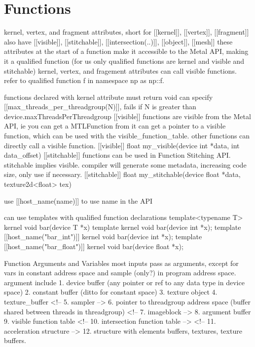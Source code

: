 

\section{Functions}

kernel, vertex, and fragment attributes, short for [[kernel]], [[vertex]], [[fragment]]
also have [[visible]], [[stitchable]], [[intersection(..)]], [[object]], [[mesh]]
these attributes at the start of a function make it accessible to the Metal API, making it a qualified function (for us only qualified functions are kernel and visible and stitchable)
kernel, vertex, and fragement attributes can call visible functions.
refer to qualified function f in namespace np as np::f.

functions declared with kernel attribute must return void
can specify [[max_threads_per_threadgroup(N)]], fails if N is greater than device.maxThreadsPerThreadgroup
[[visible]] functions are visible from the Metal API, ie you can get a MTLFunction from it can get a pointer to a visible function, which can be used with the visible_function_table. other functions can directly call a visible function.
[[visible]] float my_visible(device int *data, int data_offset) {}
[[stitchable]] functions can be used in Function Stitching API. stitchable implies visible. compiler will generate some metadata, increasing code size, only use if necessary.
[[stitchable]] float my_stitchable(device float *data, texture2d<float> tex) {}

use [[host_name(name)]] to use name in the API

can use templates with qualified function declarations
template<typename T>
kernel void bar(device T *x) {}
template kernel void bar(device int *x);
template [[host_name("bar_int")]] kernel void bar(device int *x);
template [[host_name("bar_float")]] kernel void bar(device float *x);

Function Arguments and Variables
most inputs pass as arguments, except for vars in constant address space and sample (only?) in program address space.
argument include
1. device buffer (any pointer or ref to any data type in device space)
2. constant buffer (ditto for constant space)
3. texture object
4. texture_buffer
<!-- 5. sampler -->
6. pointer to threadgroup address space (buffer shared between threads in threadgroup)
<!-- 7. imageblock -->
8. argument buffer
9. visible function table
<!-- 10. intersection function table -->
<!-- 11. acceleration structure -->
12. structure with elements buffers, textures, texture buffers. 

